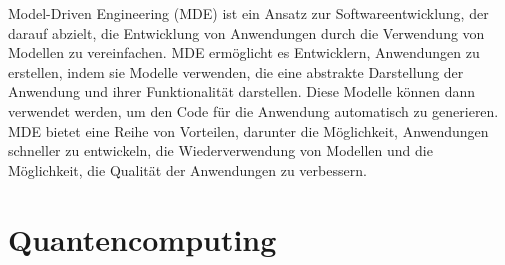 Model-Driven Engineering (MDE) ist ein Ansatz zur Softwareentwicklung, der darauf abzielt,
die Entwicklung von Anwendungen durch die Verwendung von Modellen zu vereinfachen. MDE
ermöglicht es Entwicklern, Anwendungen zu erstellen, indem sie Modelle verwenden, die
eine abstrakte Darstellung der Anwendung und ihrer Funktionalität darstellen. Diese
Modelle können dann verwendet werden, um den Code für die Anwendung automatisch zu
generieren. MDE bietet eine Reihe von Vorteilen, darunter die Möglichkeit, Anwendungen
schneller zu entwickeln, die Wiederverwendung von Modellen und die Möglichkeit, die
Qualität der Anwendungen zu verbessern.

\section{Quantencomputing}
